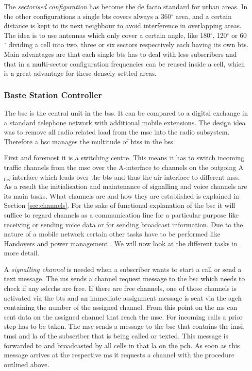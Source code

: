 The \emph{sectorised configuration} has become the de facto standard for urban areas.
In the other configurations a single \gls{bts} covers always a 360$^\circ$ area, and a certain distance is kept to its next neighbour to avoid interference in overlapping areas.
The idea is to use antennas which only cover a certain angle, like 180$^\circ$, 120$^\circ$ or 60$^\circ$ dividing a cell into two, three or six sectors respectively each having its own \gls{bts}.
Main advantages are that each single \gls{bts} has to deal with less subscribers and that in a multi-sector configuration frequencies can be reused inside a cell, which is  a great advantage for these densely settled areas.

\subsubsection{Baste Station Controller}
The \gls{bsc} is the central unit in the \gls{bss}.
It can be compared to a digital exchange in a standard telephone network with additional mobile extensions.
The design idea was to remove all radio related load from the \gls{msc} into the radio subsystem.
Therefore a \gls{bsc} manages the multitude of \glspl{bts} in the \gls{bss}.

First and foremost it is a switching centre.
This means it has to switch incoming traffic channels from the \gls{msc} over the A-interface to channels on the outgoing A$_\text{bis}$-interface which leads over the \gls{bts} and thus the air interface to different \glspl{ms}.
As a result the initialisation and maintenance of signalling and voice channels are its main tasks.
What channels are and how they are established is explained in Section \ref{sec:channels}.
For the sake of functional explanation of the \gls{bsc} it will suffice to regard channels as a communication line for a particular purpose like receiving or sending voice data or  for sending broadcast information.
Due to the nature of a mobile network certain other tasks have to be performed like Handovers and power management \cite{kommsys2006}.
We will now look at the different tasks in more detail.

A \emph{signalling channel} is needed when a subscriber wants to start a call or send a text message.
The \gls{ms} sends a channel request message to the \gls{bsc} which needs to check if any \glspl{sdcch} are free.
If there are free channels, one of those channels is activated via the \gls{bts} and an immediate assignment message is sent via the \gls{agch} containing the number of the assigned channel.
From this point on the \gls{ms} can sent data on the assigned channel that reach the \gls{msc}.
For incoming calls a prior step has to be taken.
The \gls{msc} sends a message to the \gls{bsc} that contains the \gls{imsi}, \gls{tmsi} and \gls{la} of the subscriber that is being called or texted.
This message is forwarded to and broadcasted by all cells in that \gls{la} on the \gls{pch}.
As soon as this message arrives at the respective \gls{ms} it requests a channel with the procedure outlined above.

